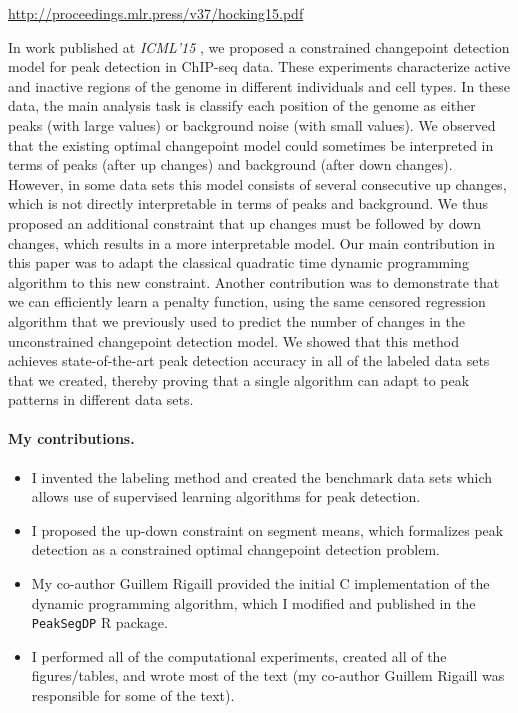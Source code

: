 \documentclass{article}
\begin{document}
\url{http://proceedings.mlr.press/v37/hocking15.pdf}

In work published at \emph{ICML'15} \citep{HOCKING-PeakSeg}, we
proposed a constrained changepoint detection model for peak detection
in ChIP-seq data. These experiments characterize active and inactive
regions of the genome in different individuals and cell types. In
these data, the main analysis task is classify each position of the
genome as either peaks (with large values) or background noise (with
small values). We observed that the existing optimal changepoint model
could sometimes be interpreted in terms of peaks (after up changes)
and background (after down changes). However, in some data sets this
model consists of several consecutive up changes, which is not
directly interpretable in terms of peaks and background. We thus
proposed an additional constraint that up changes must be followed by
down changes, which results in a more interpretable model. Our main
contribution in this paper was to adapt the classical quadratic time
dynamic programming algorithm to this new constraint. Another
contribution was to demonstrate that we can efficiently learn a
penalty function, using the same censored regression algorithm that we
previously used to predict the number of changes in the unconstrained
changepoint detection model. We showed that this method achieves
state-of-the-art peak detection accuracy in all of the labeled data
sets that we created, thereby proving that a single algorithm can
adapt to peak patterns in different data sets.

\paragraph{My contributions.} 
\begin{itemize}
\item I invented the labeling method and created the benchmark data
  sets which allows use of supervised learning algorithms for
  peak detection.
\item I proposed the up-down constraint on segment means, which
  formalizes peak detection as a constrained optimal changepoint
  detection problem.
\item My co-author Guillem Rigaill provided the initial C
  implementation of the dynamic programming algorithm, which I
  modified and published in the \texttt{PeakSegDP} R package.
\item I performed all of the computational experiments, created all of
  the figures/tables, and wrote most of the text (my co-author Guillem
  Rigaill was responsible for some of the text).
\end{itemize}



\end{document}
